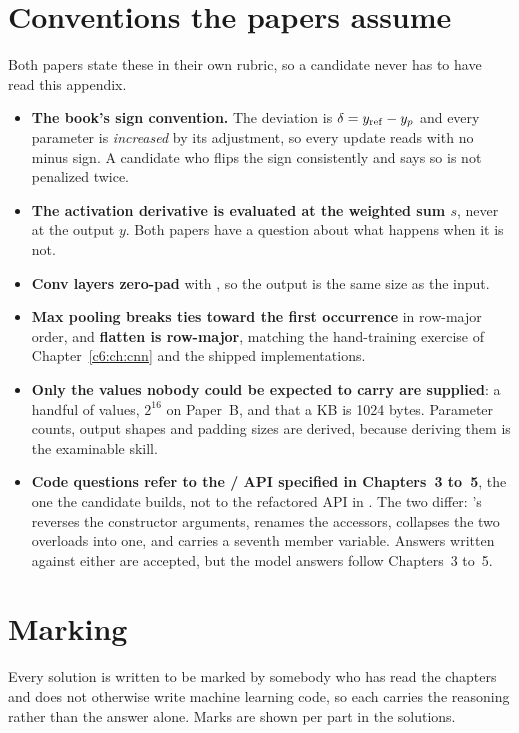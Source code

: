\section*{Conventions the papers assume}
Both papers state these in their own rubric, so a candidate never has to have read this appendix.
\begin{itemize}
  \item \textbf{The book's sign convention.} The deviation is $\delta = y_{\mathrm{ref}} - y_{p}$ and every
    parameter is \emph{increased} by its adjustment, so every update reads
     with no minus sign. A candidate who flips the sign
    consistently and says so is not penalized twice.
  \item \textbf{The activation derivative is evaluated at the weighted sum $s$}, never at the output
    $y$. Both papers have a question about what happens when it is not.
  \item \textbf{Conv layers zero-pad} with , so the output is the same
    size as the input.
  \item \textbf{Max pooling breaks ties toward the first occurrence} in row-major order, and
    \textbf{flatten is row-major}, matching the hand-training exercise of
    Chapter~\ref{c6:ch:cnn} and the shipped implementations.
  \item \textbf{Only the values nobody could be expected to carry are supplied}: a handful of
     values, $2^{16}$ on Paper~B, and that a KB is 1024 bytes. Parameter counts, output
    shapes and padding sizes are derived, because deriving them is the examinable skill.
  \item \textbf{Code questions refer to the / API specified in
    Chapters~3 to~5}, the one the candidate builds, not to the refactored API in .
    The two differ: 's  reverses the constructor arguments, renames the
    accessors, collapses the two  overloads into one, and carries a seventh
    member variable. Answers written against either are accepted, but the model answers follow
    Chapters~3 to~5.
\end{itemize}

\section*{Marking}
Every solution is written to be marked by somebody who has read the chapters and does not otherwise
write machine learning code, so each carries the reasoning rather than the answer alone. Marks are
shown per part in the solutions.

